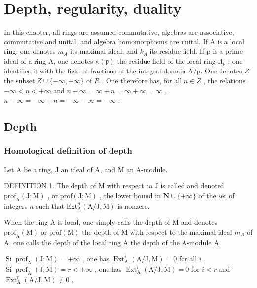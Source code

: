 \chapter{Depth, regularity, duality}

In this chapter, all rings are assumed commutative, algebras are associative, commutative and unital, and algebra homomorphisms are unital. If A is a local ring, one denotes \(m_{A}\) its maximal ideal, and \(k_{A}\) its residue field. If p is a prime ideal of a ring A, one denotes \(\kappa(\mathfrak{p})\) the residue field of the local ring \(A_{p}\) ; one identifies it with the field of fractions of the integral domain A/p. One denotes \(\overline{Z}\) the subset \(Z \cup \{-\infty, +\infty\}\) of \(\overline{R}\) . One therefore has, for all \(n \in Z\) , the relations \(-\infty < n < +\infty\) and \(n + \infty = \infty + n = \infty + \infty = \infty\) , \(n - \infty = -\infty + n = -\infty - \infty = -\infty\) .

\section{Depth}

\subsection{Homological definition of depth}

Let A be a ring, J an ideal of A, and M an A-module.

DEFINITION 1. The depth of M with respect to J is called and denoted \(\mathrm{prof}_{\mathrm{A}}(\mathrm{J};\mathrm{M})\) , or \(\mathrm{prof}(\mathrm{J};\mathrm{M})\) , the lower bound in \(\mathbf{N}\cup\{+\infty\}\) of the set of integers \(n\) such that \(\mathrm{Ext}_{\mathrm{A}}^{n}(\mathrm{A}/\mathrm{J},\mathrm{M})\) is nonzero.

When the ring A is local, one simply calls the depth of M and denotes \(\text{prof}_{\mathrm{A}}(\mathrm{M})\) or \(\text{prof}(\mathrm{M})\) the depth of M with respect to the maximal ideal \(m_{A}\) of A; one calls the depth of the local ring A the depth of the A-module A.

\(\operatorname{Si} \operatorname{prof}_{\mathrm{A}}(\mathrm{J}; \mathrm{M}) = +\infty\) , one has \(\operatorname{Ext}_{\mathrm{A}}^{i}(\mathrm{A}/\mathrm{J}, \mathrm{M}) = 0\) for all \(i\) . \(\operatorname{Si} \operatorname{prof}_{\mathrm{A}}(\mathrm{J}; \mathrm{M}) = r < +\infty\) , one has \(\operatorname{Ext}_{\mathrm{A}}^{i}(\mathrm{A}/\mathrm{J}, \mathrm{M}) = 0\) for \(i < r\) and \(\operatorname{Ext}_{\mathrm{A}}^{r}(\mathrm{A}/\mathrm{J}, \mathrm{M}) \neq 0\) .

